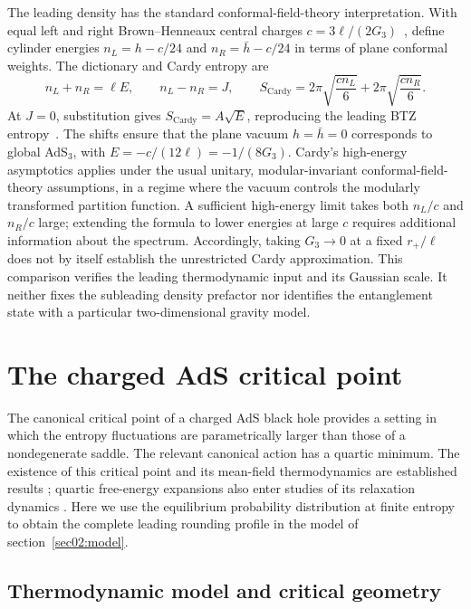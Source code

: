 \documentclass[11pt,letterpaper]{article}
\theoremstyle{plain}
\theoremstyle{definition}
\theoremstyle{remark}
\begin{document}
The leading density has the standard conformal-field-theory interpretation. With equal left and right Brown--Henneaux central charges $c=3\ell/(2G_3)$~\cite{brown1986}, define cylinder energies $n_L=h-c/24$ and $n_R=\bar h-c/24$ in terms of plane conformal weights. The dictionary and Cardy entropy are
\begin{equation}
 n_L+n_R=\ell E,\qquad n_L-n_R=J,\qquad
 S_{\mathrm{Cardy}}=2\pi\sqrt{\frac{c n_L}{6}}
                  +2\pi\sqrt{\frac{c n_R}{6}}.
 \label{eq10:cardy_dictionary}
\end{equation}
At $J=0$, substitution gives $S_{\mathrm{Cardy}}=A\sqrt E$, reproducing the leading BTZ entropy~\cite{cardy1986,strominger1998}. The shifts ensure that the plane vacuum $h=\bar h=0$ corresponds to global AdS$_3$, with $E=-c/(12\ell)=-1/(8G_3)$. Cardy's high-energy asymptotics applies under the usual unitary, modular-invariant conformal-field-theory assumptions, in a regime where the vacuum controls the modularly transformed partition function. A sufficient high-energy limit takes both $n_L/c$ and $n_R/c$ large; extending the formula to lower energies at large $c$ requires additional information about the spectrum. Accordingly, taking $G_3\to0$ at a fixed $r_+/\ell$ does not by itself establish the unrestricted Cardy approximation. This comparison verifies the leading thermodynamic input and its Gaussian scale. It neither fixes the subleading density prefactor nor identifies the entanglement state with a particular two-dimensional gravity model.

\section{The charged AdS critical point}
\label{sec03:critical}

The canonical critical point of a charged AdS black hole provides a
setting in which the entropy fluctuations are parametrically larger
than those of a nondegenerate saddle.  The relevant canonical action
has a quartic minimum.  The existence of this critical point and its
mean-field thermodynamics are established results
\cite{chamblin1999,kubiznakmann2012}; quartic free-energy expansions also
enter studies of its relaxation dynamics \cite{awal2026}.  Here we use
the equilibrium probability distribution at finite entropy to obtain
the complete leading rounding profile in the model of
section~\ref{sec02:model}.

\subsection{Thermodynamic model and critical geometry}
\end{document}

